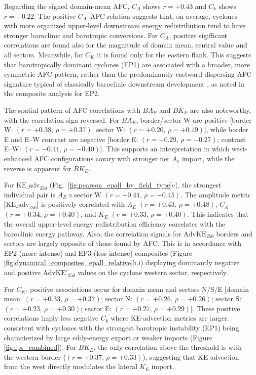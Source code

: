 \documentclass[pdflatex,sn-chicago]{sn-jnl}%
\theoremstyle{plain}
\theoremstyle{definition}
\theoremstyle{remark}
\theoremstyle{definition}
\begin{document}
Regarding the signed domain-mean AFC, $C_A$ shows $r = +0.43$ and $C_k$ shows $r = -0.22$. The positive $C_A$–AFC relation suggests that, on average, cyclones with more organized upper-level downstream energy redistribution tend to have stronger baroclinic and barotropic conversions. For $C_A$, positive sigifficant correlations are found also for the magnitude of domain mean, central value and all sectors. Meanwhile, for $C_K$ it is found only for the eastern flank. This suggests that barotropically dominant cyclones (EP1) are associated with a broader, more symmetric AFC pattern, rather than the predominantly eastward-dispersing AFC signature typical of classically
baroclinic downstream development \citep{orlanski1991life}, as noted in the composite analysis for EP2.

The spatial pattern of AFC correlations with $BA_E$ and $BK_E$ are also noteworthy, with the correlation sign reversed. For $BA_E$, border/sector W are positive [border W: $(r=+0.38,\,\rho=+0.37)$; sector W: $(r=+0.20,\,\rho=+0.19)$], while border E and E--W contrast are negative [border E: $(r=-0.29,\,\rho=-0.27)$; contrast E--W: $(r=-0.41,\,\rho=-0.40)$]. This supports an interpretation in which west-enhanced AFC configurations covary with stronger net $A_e$ import, while the reverse is apparent for $BK_E$.

For $\mathrm{KE\_adv}_{250}$ (Fig.~\ref{fig:pearson_epall_by_field_type}c), the strongest individual pair is $A_E\times$sector W $(r=-0.44,\,\rho=-0.45)$. The amplitude metric $|\mathrm{KE\_adv}_{250}|$ is positively correlated with $A_E$ $(r=+0.43,\,\rho=+0.48)$, $C_A$ $(r=+0.34,\,\rho=+0.40)$, and $K_E$ $(r=+0.33,\,\rho=+0.40)$. This indicates that the overall upper-level energy redistribution efficiency correlates with the baroclinic energy pathway. Also, the correlation signals for $\mathrm{AdvKE}_{250}$ borders and sectors are largely opposite of those found by AFC. This is in accordance with EP2 (more intense) and EP3 (less intense) composites (Figure \ref{fig:dynamical_composites_epall_relative}h,i) displaying dominantly negative and positive $\mathrm{AdvKE'}_{250}$ values on the cyclone western sector, respectively.

For $C_K$, positive associations occur for domain mean and sectors N/S/E [domain mean: $(r=+0.33,\,\rho=+0.37)$; sector N: $(r=+0.26,\,\rho=+0.26)$; sector S: $(r=+0.23,\,\rho=+0.30)$; sector E: $(r=+0.27,\,\rho=+0.29)$]. These positive correlations imply less negative $C_k$ where KE-advection metrics are larger. consistent with cyclones with the strongest barotropic instability (EP1) being characterized by large eddy-energy export or weaker imports (Figure \ref{fig:lps_combined}). For $BK_E$, the only correlation above the threshold is with the western border ($(r=+0.37,\,\rho=+0.33)$), suggesting that KE advection from the west directly modulates the lateral $K_E$ import.
\end{document}
